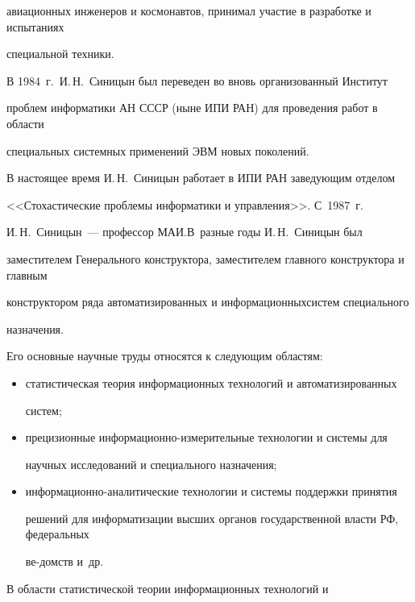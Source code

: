 авиационных инженеров и космонавтов, принимал участие в разработке и испытаниях 

специальной техники.

      

      В 1984~г.\ И.\,Н.~Синицын был переведен во вновь организованный Институт 

проблем информатики АН СССР (ныне ИПИ РАН) для проведения работ в области 

специальных системных применений ЭВМ новых поколений.

      

      В настоящее время И.\,Н.~Синицын работает в ИПИ РАН заведующим отделом 

<<Стохастические проблемы информатики и управления>>. С~1987~г.\ 

И.\,Н.~Синицын~--- профессор МАИ.\linebreak В~разные годы И.\,Н.~Синицын был 

заместителем Генерального конструктора, заместителем главного конструктора и главным 

конструктором ряда автоматизированных и информационных\linebreak систем специального 

назначения.

     

     Его основные научные труды относятся к следующим об\-ластям:

     \begin{itemize}

     \item статистическая теория информационных технологий и автоматизированных 

систем;

     \item прецизионные информационно-измерительные технологии и системы для 

научных исследований и специального назначения;

     \item информационно-аналитические технологии и системы поддержки принятия 

решений для информатизации высших органов государственной власти РФ, федеральных 

ве-\linebreak домств и~др.

     \end{itemize}

     

     В области статистической теории информационных тех\-но\-логий и 

